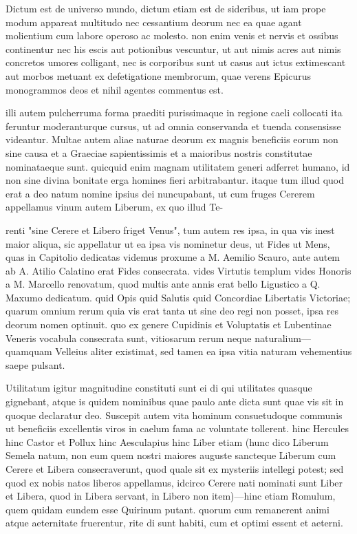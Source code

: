  Dictum est de universo mundo, dictum etiam est de sideribus, ut iam prope modum appareat multitudo nec cessantium deorum nec ea quae agant molientium cum labore operoso ac molesto. non enim venis et nervis et ossibus continentur nec his escis aut potionibus vescuntur, ut aut nimis acres aut nimis concretos umores colligant, nec is corporibus sunt ut casus aut ictus extimescant aut morbos metuant ex defetigatione membrorum, quae verens Epicurus monogrammos deos et nihil agentes commentus est.

 illi autem pulcherruma forma praediti purissimaque in regione caeli collocati ita feruntur moderanturque cursus, ut ad omnia conservanda et tuenda consensisse videantur. Multae autem aliae naturae deorum ex magnis beneficiis eorum non sine causa et a Graeciae sapientissimis et a maioribus nostris constitutae nominataeque sunt. quicquid enim magnam utilitatem generi adferret humano, id non sine divina bonitate erga homines fieri arbitrabantur. itaque tum illud quod erat a deo natum nomine ipsius dei nuncupabant, ut cum fruges Cererem appellamus vinum autem Liberum, ex quo illud Te-

 renti "sine Cerere et Libero friget Venus", tum autem res ipsa, in qua vis inest maior aliqua, sic appellatur ut ea ipsa vis nominetur deus, ut Fides ut Mens, quas in Capitolio dedicatas videmus proxume a M. Aemilio Scauro, ante autem ab A. Atilio Calatino erat Fides consecrata. vides Virtutis templum vides Honoris a M. Marcello renovatum, quod multis ante annis erat bello Ligustico a Q. Maxumo dedicatum. quid Opis quid Salutis quid Concordiae Libertatis Victoriae; quarum omnium rerum quia vis erat tanta ut sine deo regi non posset, ipsa res deorum nomen optinuit. quo ex genere Cupidinis et Voluptatis et Lubentinae Veneris vocabula consecrata sunt, vitiosarum rerum neque naturalium—quamquam Velleius aliter existimat, sed tamen ea ipsa vitia naturam vehementius saepe pulsant.

 Utilitatum igitur magnitudine constituti sunt ei di qui utilitates quasque gignebant, atque is quidem nominibus quae paulo ante dicta sunt quae vis sit in quoque declaratur deo. Suscepit autem vita hominum consuetudoque communis ut beneficiis excellentis viros in caelum fama ac voluntate tollerent. hinc Hercules hinc Castor et Pollux hinc Aesculapius hinc Liber etiam (hunc dico Liberum Semela natum, non eum quem nostri maiores auguste sancteque Liberum cum Cerere et Libera consecraverunt, quod quale sit ex mysteriis intellegi potest; sed quod ex nobis natos liberos appellamus, idcirco Cerere nati nominati sunt Liber et Libera, quod in Libera servant, in Libero non item)—hinc etiam Romulum, quem quidam eundem esse Quirinum putant. quorum cum remanerent animi atque aeternitate fruerentur, rite di sunt habiti, cum et optimi essent et aeterni.

